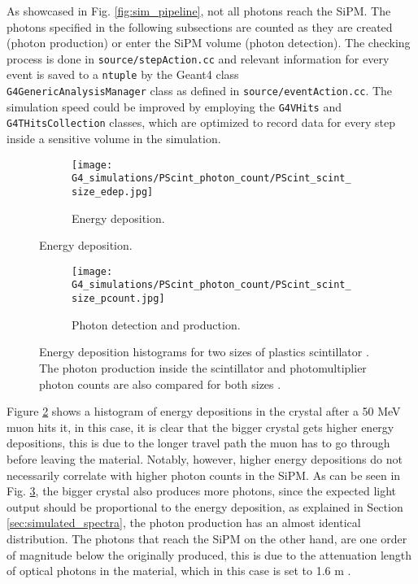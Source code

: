 As showcased in Fig. \ref{fig:sim_pipeline}, not all photons reach the SiPM. The photons specified in the following subsections are counted as they are created (photon production) or enter the SiPM volume (photon detection). The checking process is done in \texttt{source/stepAction.cc} and relevant information for every event is saved to a \texttt{ntuple} by the Geant4 class\\ \texttt{G4GenericAnalysisManager} class as defined in \texttt{source/eventAction.cc}. The simulation speed could be improved by employing the \texttt{G4VHits} and \texttt{G4THitsCollection} classes, which are optimized to record data for every step inside a sensitive volume in the simulation.

\begin{figure}[H]
  \centering
  \begin{subfigure}[t]{.98\textwidth}
    \texttt{[image: G4\_simulations/PScint\_photon\_count/PScint\_scint\_size\_edep.jpg]}
    \caption{\label{sfig:PScint_phot_count_edep}Energy deposition.}
  \end{subfigure}
\end{figure}
\begin{figure}[H]\ContinuedFloat
  \begin{subfigure}[t]{.98\textwidth}
    \texttt{[image: G4\_simulations/PScint\_photon\_count/PScint\_scint\_size\_pcount.jpg]}
    \caption{\label{sfig:PScint_phot_count_pcount}Photon detection and production.}
  \end{subfigure}
  \caption{\label{fig:PScint_phot_count}Energy deposition histograms for two sizes of plastics scintillator . The photon production inside the scintillator and photomultiplier photon counts are also compared for both sizes .}
\end{figure}

Figure \ref{sfig:PScint_phot_count_edep} shows a histogram of energy depositions in the crystal after a 50 \unit{\mega\eV} muon hits it, in this case, it is clear that the bigger crystal gets higher energy depositions, this is due to the longer travel path the muon has to go through before leaving the material. Notably, however, higher energy depositions do not necessarily correlate with higher photon counts in the SiPM. As can be seen in Fig. \ref{sfig:PScint_phot_count_pcount}, the bigger crystal also produces more photons, since the expected light output should be proportional to the energy deposition, as explained in Section \ref{sec:simulated_spectra}, the photon production has an almost identical distribution. The photons that reach the SiPM on the other hand, are one order of magnitude below the originally produced, this is due to the attenuation length of optical photons in the material, which in this case is set to 1.6 \unit{\m} \cite{Luxium_plastic}.

